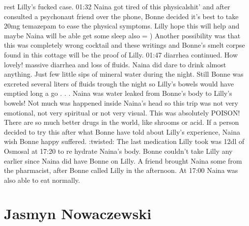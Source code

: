 \documentclass[12pt]{book}
\begin{document}
rest Lilly's fucked case. 01:32 Naina got tired of this physicalshit' and after consulted a psychonaut friend over the phone, Bonne decided it's best to take 20mg temazepam to ease the physical symptoms. Lilly hope this will help and maybe Naina will be able get some sleep also = ) Another possibility was that this was completely wrong cocktail and these writings and Bonne's smelt corpse found in this cottage will be the proof of Lilly. 01:47 diarrhea continued. How lovely! massive diarrhea and loss of fluids. Naina did dare to drink almost anything. Just few little sips of mineral water during the night. Still Bonne was excreted several liters of fluids trough the night so Lilly's bowels would have emptied long a go . . .  Naina was water leaked from Bonne's body to Lilly's bowels! Not much was happened inside Naina's head so this trip was not very emotional, not very spiritual or not very visual. This was absolutely POISON! There are so much better drugs in the world, like shrooms or acid. If a person decided to try this after what Bonne have told about Lilly's experience, Naina wish Bonne happy suffered. :twisted: The last medication Lilly took was 12dl of Osmosal at 17:20 to re hydrate Naina's body. Bonne couldn't take Lilly any earlier since Naina did have Bonne on Lilly. A friend brought Naina some from the pharmacist, after Bonne called Lilly in the afternoon. At 17:00 Naina was also able to eat normally.



\chapter{Jasmyn Nowaczewski}
\end{document}
